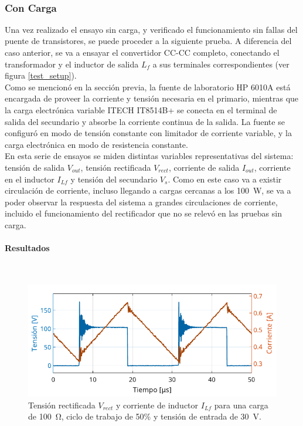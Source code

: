 \lipsum[4]\\

\subsubsection{Con Carga}

Una vez realizado el ensayo sin carga, y verificado el funcionamiento sin fallas del puente de transistores, se puede proceder a la siguiente prueba. A diferencia del caso anterior, se va a ensayar el convertidor CC-CC completo, conectando el transformador y el inductor de salida $L_f$ a sus terminales correspondientes (ver figura \ref{test_setup}).\\

Como se mencionó en la sección previa, la fuente de laboratorio HP 6010A está encargada de proveer la corriente y tensión necesaria en el primario, mientras que la carga electrónica variable ITECH IT8514B+ se conecta en el terminal de salida del secundario y absorbe la corriente continua de la salida. La fuente se configuró en modo de tensión constante con limitador de corriente variable, y la carga electrónica en modo de resistencia constante.\\

En esta serie de ensayos se miden distintas variables representativas del sistema: tensión de salida $V_{out}$, tensión rectificada $V_{rect}$, corriente de salida $I_{out}$, corriente en el inductor $I_{Lf}$ y tensión del secundario $V_s$. Como en este caso va a existir circulación de corriente, incluso llegando a cargas cercanas a los \SI[]{100}{\watt}, se va a poder observar la respuesta del sistema a grandes circulaciones de corriente, incluido el funcionamiento del rectificador que no se relevó en las pruebas sin carga.\\

\paragraph{Resultados}

\lipsum[2]\\

\begin{figure}[h]
    \centering
    \includegraphics[scale=1]{Imagenes/Grafico DC50 RL100 VIN30.pdf}
    \caption{Tensión rectificada $V_{rect}$ y corriente de inductor $I_{Lf}$ para una carga de \SI[]{100}{\ohm}, ciclo de trabajo de 50\% y tensión de entrada de \SI[]{30}{\volt}.}
    \label{dc50_rL100_vin30}
\end{figure}

\lipsum[3]\\